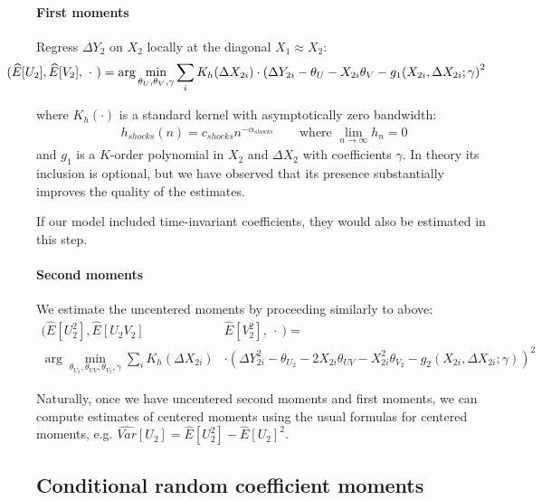\paragraph{First moments} Regress $\Delta Y_2$ on $X_2$ locally at the diagonal $X_1 \approx X_2$:
\begin{align}
  \hspace*{-1cm}
  (\widehat{E}[U_2], \widehat{E}[V_2], \ \cdot \ ) = \arg \min_{\theta_{U} ,\theta_{V}, \gamma}
\sum_{i} K_h (\Delta X_{2i}) \cdot 
      \left( \Delta Y_{2i} - \theta_{U} - X_{2i}\theta_{V} - g_1(X_{2i}, \Delta X_{2i}; \gamma \right)^2
\end{align}

\noindent where $K_h(\cdot)$ is a standard kernel with asymptotically zero bandwidth:
\begin{align}
  h_{shocks}(n) = c_{shocks}n^{−\alpha_{shocks}} \qquad \text{where } \lim_{n\rightarrow \infty} h_{n} = 0
\end{align}
\noindent and $g_1$ is a $K$-order polynomial in $X_2$ and $\Delta X_2$ with coefficients $\gamma$. In theory its inclusion is optional, but we have observed that its presence substantially improves the quality of the estimates. 

If our model included time-invariant coefficients, they would also be estimated in this step.



\paragraph{Second moments} We estimate the uncentered moments by proceeding similarly to above:
\begin{align}
  (\widehat{E}[U_2^2], \widehat{E}[U_2 V_2] &\widehat{E}[V_2^2], \ \cdot \ ) = \\  
  \arg \min_{\theta_{U_2} , \theta_{UV}, \theta_{V_2}, \gamma}
\sum_{i} K_h(\Delta X_{2i}) &\cdot 
      \left( \Delta Y_{2i}^2 - \theta_{U_2} - 2X_{2i}\theta_{UV}  - X_{2i}^2\theta_{V_2} - g_2(X_{2i}, \Delta X_{2i}; \gamma) \right)^2
\end{align}

Naturally, once we have uncentered second moments and first moments, we can compute estimates of centered moments using the usual formulas for centered moments, e.g. $\widehat{Var}[U_2] = \widehat{E}[U_2^2] - \widehat{E}[U_2]^2$. 

\subsection*{Conditional random coefficient moments}



